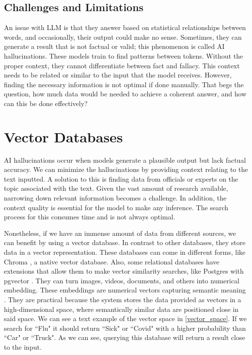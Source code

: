 \subsection{Challenges and Limitations}
An issue with LLM is that they answer based on statistical relationships between words, and occasionally, their output could make no sense. Sometimes, they can generate a result that is not factual
or valid; this phenomenon is called AI hallucinations. These models train to find patterns between tokens. Without the proper context, they cannot differentiate between fact and fallacy. This context
needs to  be related or similar to the input that the model receives. However, finding the necessary information is not optimal if done manually. That begs the question, how much data would be needed
to achieve a coherent answer, and how can this be done effectively?


\section{Vector Databases}
AI hallucinations occur when models generate a plausible output but lack factual accuracy. We can minimize the hallucinations by providing context relating to the text inputted. A solution to this
is finding data from officials or experts on the topic associated with the text. Given the vast amount of research available, narrowing down relevant information becomes a challenge. In addition,
the context quality is essential for the model to make any inference. The search process for this consumes time and is not always optimal. 

Nonetheless, if we have an immense amount of data from different sources, we can benefit by using a vector database. In contrast to other databases, they store data in a vector representation.
These databases can come in different forms, like Chroma \cite{chroma}, a native vector database. Also, some relational databases have extensions that allow them to make vector similarity searches,
like Postgres with pgvector \cite{pgvector}. They can turn images, videos, documents, and others into numerical embedding. These embeddings are numerical vectors capturing semantic meaning \cite{10455990}.
They are practical because the system stores the data provided as vectors in a high-dimensional space, where semantically similar data are positioned close in said space. We can see a text example of the vector
space in \ref{vector_space}. If we search for ``Flu" it should return ``Sick" or ``Covid" with a higher probability than ``Car" or ``Truck". As we can see, querying this database will return a result close to the input.

